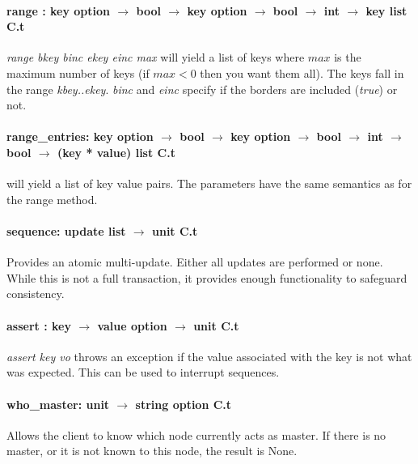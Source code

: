 \paragraph{range : key option $\rightarrow$ bool $\rightarrow$
  key option $\rightarrow$ bool $\rightarrow$
  int $\rightarrow$ key list C.t}
\emph{range bkey binc ekey einc max} will yield a list of keys where
$max$ is the maximum number of keys (if $max < 0$ then you want them all).
The keys fall in the range \emph{kbey..ekey}.
\emph{binc} and \emph{einc} specify if the borders are included (\emph{true}) or not.

\paragraph{range\_entries: key option $\rightarrow$ bool $\rightarrow$
  key option $\rightarrow$ bool $\rightarrow$
  int $\rightarrow$ bool $\rightarrow$ (key * value) list C.t
}
will yield a list of key value pairs.
The parameters have the same semantics as for the range method.


\paragraph{sequence: update list $\rightarrow$ unit C.t}
Provides an atomic multi-update. Either all updates are performed or none. 
While this is not a full transaction, it provides enough functionality to safeguard consistency.

\paragraph{assert : key $\rightarrow$ value option $\rightarrow$ unit C.t}
\emph{assert key vo} throws an exception if the value associated with the key is not what was expected. 
This can be used to interrupt sequences.


\paragraph{who\_master: unit $\rightarrow$ string option C.t}
Allows the client to know which node currently acts as master.
If there is no master, or it is not known to this node, the result is None.
%

